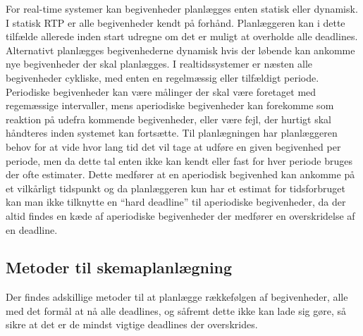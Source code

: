 For real-time systemer kan begivenheder planlægges enten statisk eller dynamisk\cite{cheng1987scheduling}. I statisk RTP er alle begivenheder kendt på forhånd. Planlæggeren kan i dette tilfælde allerede inden start udregne om det er muligt at overholde alle deadlines. Alternativt planlægges begivenhederne dynamisk hvis der løbende kan ankomme nye begivenheder der skal planlægges. I realtidssystemer er næsten alle begivenheder cykliske, med enten en regelmæssig eller tilfældigt periode. Periodiske begivenheder kan være målinger der skal være foretaget med regemæssige intervaller, mens aperiodiske begivenheder kan forekomme som reaktion på udefra kommende begivenheder, eller være fejl, der hurtigt skal håndteres inden systemet kan fortsætte.
Til planlægningen har planlæggeren behov for at vide hvor lang tid det vil tage at udføre en given begivenhed per periode, men da dette tal enten ikke kan kendt eller fast for hver periode bruges der ofte estimater. Dette medfører at en aperiodisk begivenhed kan ankomme på et vilkårligt tidspunkt og da planlæggeren kun har et estimat for tidsforbruget kan man  ikke tilknytte en ``hard deadline'' til aperiodiske begivenheder, da der altid findes en kæde af aperiodiske begivenheder der medfører en overskridelse af en deadline. 


\subsection{Metoder til skemaplanlægning}
Der findes adskillige metoder til at planlægge rækkefølgen af begivenheder, alle med det formål at nå alle deadlines, og såfremt dette ikke kan lade sig gøre, så sikre at det er de mindst vigtige deadlines der overskrides. 

